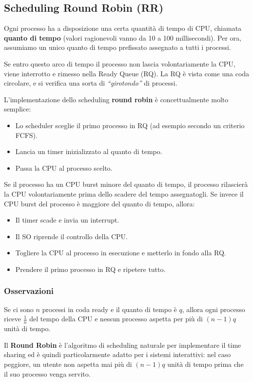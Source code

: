 \subsection{Scheduling Round Robin (RR)}
Ogni processo ha a disposizione una certa quantità di tempo di CPU, chiamata \textbf{quanto di tempo} (valori ragionevoli vanno da 10 a 100 millisecondi). Per ora, assumiamo un unico quanto di tempo prefissato assegnato a tutti i processi. 

Se entro questo arco di tempo il processo non lascia volontariamente la CPU, viene interrotto e rimesso nella Ready Queue (RQ). La RQ è vista come una coda circolare, e si verifica una sorta di \textit{“girotondo”} di processi.

L'implementazione dello scheduling \textbf{round robin} è concettualmente molto semplice:
\begin{itemize}
    \item Lo scheduler sceglie il primo processo in RQ (ad esempio secondo un criterio FCFS).
    \item Lancia un timer inizializzato al quanto di tempo.
    \item Passa la CPU al processo scelto.
\end{itemize}

Se il processo ha un CPU burst minore del quanto di tempo, il processo rilascierà la CPU volontariamente prima dello scadere del tempo assegnatogli. Se invece il CPU burst del processo è maggiore del quanto di tempo, allora:
\begin{itemize}
    \item Il timer scade e invia un interrupt.
    \item Il SO riprende il controllo della CPU.
    \item Togliere la CPU al processo in esecuzione e metterlo in fondo alla RQ.
    \item Prendere il primo processo in RQ e ripetere tutto.
\end{itemize}

\subsubsection{Osservazioni}
Se ci sono \( n \) processi in coda ready e il quanto di tempo è \( q \), allora ogni processo riceve \( \frac{1}{n} \) del tempo della CPU e nessun processo aspetta per più di \( (n-1)q \) unità di tempo.

Il \textbf{Round Robin} è l'algoritmo di scheduling naturale per implementare il time sharing ed è quindi particolarmente adatto per i sistemi interattivi: nel caso peggiore, un utente non aspetta mai più di \( (n-1)q \) unità di tempo prima che il suo processo venga servito.

